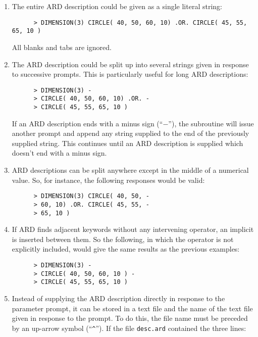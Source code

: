 \begin{enumerate}

\item The entire ARD description could be given as a single literal string:

\small
\begin{verbatim}
      > DIMENSION(3) CIRCLE( 40, 50, 60, 10) .OR. CIRCLE( 45, 55, 65, 10 ) 
\end{verbatim}
\normalsize

All blanks and tabs are ignored.

\item The ARD description could be split up into several strings given in
response to successive prompts. This is particularly useful for long ARD
descriptions:

\small
\begin{verbatim}
      > DIMENSION(3) -
      > CIRCLE( 40, 50, 60, 10) .OR. -
      > CIRCLE( 45, 55, 65, 10 ) 
\end{verbatim}
\normalsize

If an ARD description ends with a minus sign (``$-$''), the  subroutine 
will issue another prompt and append any string supplied to the end of the 
previously supplied string. This continues until an ARD description is supplied 
which doesn't end with a minus sign.

\item ARD descriptions can be split anywhere except in the middle of a numerical
value. So, for instance, the following responses would be valid: 

\small
\begin{verbatim}
      > DIMENSION(3) CIRCLE( 40, 50, -
      > 60, 10) .OR. CIRCLE( 45, 55, -
      > 65, 10 ) 
\end{verbatim}
\normalsize

\item If ARD finds adjacent keywords without any intervening operator, an
implicit  is inserted between them. So the following, in which the 
operator is not explicitly included, would give the same results as the previous
examples: 

\small
\begin{verbatim}
      > DIMENSION(3) -
      > CIRCLE( 40, 50, 60, 10 ) -
      > CIRCLE( 45, 55, 65, 10 ) 
\end{verbatim}
\normalsize

\item Instead of supplying the ARD description directly in response to the 
parameter prompt, it can be stored in a text file and the name of the text file 
given in response to the prompt. To do this, the file name must be 
preceded by an up-arrow symbol (``\verb+^+''). If the file \verb+desc.ard+
contained the three lines:


\end{enumerate}

